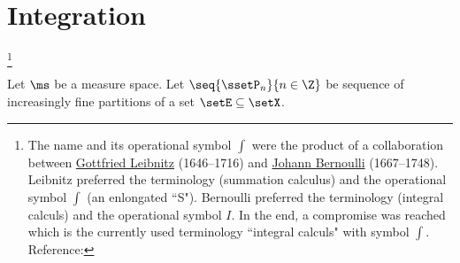 ﻿%


\chapter{Integration}


\footnote{The name  and its operational symbol $\int$ were the 
  product of a collaboration between 
  \href{http://en.wikipedia.org/wiki/Gottfried_Leibniz}{Gottfried Leibnitz} (1646--1716) 
  and \href{http://en.wikipedia.org/wiki/Johann_Bernoulli}{Johann Bernoulli} (1667--1748).
  Leibnitz preferred the terminology  (summation calculus)
  and the operational symbol $\int$ (an enlongated ``S").
  Bernoulli preferred the terminology  (integral calculs)
  and the operational symbol $I$.
  In the end, a compromise was reached which is the currently used terminology 
  ``integral calculs" with symbol $\int$.
  Reference: 
  }
\begin{definition}
\label{def:intR}
Let $\ms$ be a measure space.
Let $\seq{\ssetP_n}{n\in\Z}$ be sequence of increasingly fine partitions 
of a set $\setE\subseteq\setX$.
\end{definition}


